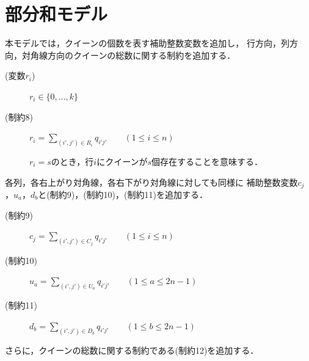 \section{部分和モデル}
本モデルでは，クイーンの個数を表す補助整数変数を追加し，
行方向，列方向，対角線方向のクイーンの総数に関する制約を追加する．
\begin{description}
 \item[(変数$r_i$)] $r_{i} \in \{0,...,k\}$ 
 \item[(制約8)] $r_{i} = \sum\limits _{(i',j') \in R_{i}} q_{i'j'} \qquad (1 \leq i \leq n)$ \par
$r_i = s$のとき，行$i$にクイーンが$s$個存在することを意味する．
\end{description}
%
各列，各右上がり対角線，各右下がり対角線に対しても同様に
補助整数変数$c_j$，$u_{a}$，$d_{b}$と(制約9)，(制約10)，(制約11)を追加する．
%
\begin{description}
 \item[(制約9)] $c_{j} = \sum\limits _{(i',j') \in C_{j}} q_{i'j'} \qquad (1 \leq i \leq n)$
 \item[(制約10)] $u_{a} = \sum\limits _{(i',j') \in U_{a}} q_{i'j'}\qquad (1 \leq a \leq 2n-1)$
 \item[(制約11)] $d_{b} = \sum\limits _{(i',j') \in D_{b}} q_{i'j'} \qquad(1 \leq b \leq 2n-1)$
\end{description}
さらに，クイーンの総数に関する制約である(制約12)を追加する．
